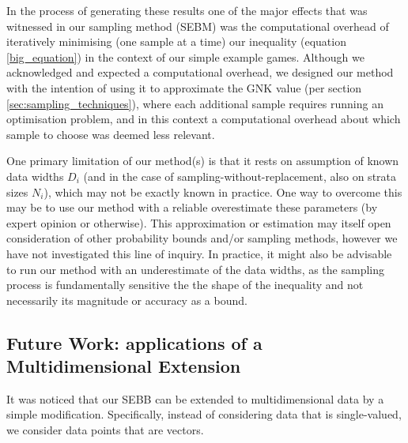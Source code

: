 In the process of generating these results one of the major effects that was witnessed in our sampling method (SEBM) was the computational overhead of iteratively minimising (one sample at a time) our inequality (equation \ref{big_equation}) in the context of our simple example games.
Although we acknowledged and expected a computational overhead, we designed our method with the intention of using it to approximate the GNK value (per section \ref{sec:sampling_techniques}), where each additional sample requires running an optimisation problem, and in this context a computational overhead about which sample to choose was deemed less relevant.


% 

One primary limitation of our method(s) is that it rests on assumption of known data widths $D_i$ (and in the case of sampling-without-replacement, also on strata sizes $N_i$), which may not be exactly known in practice.
One way to overcome this may be to use our method with a reliable overestimate these parameters (by expert opinion or otherwise). This approximation or estimation may itself open consideration of other probability bounds and/or sampling methods, however we have not investigated this line of inquiry. 
In practice, it might also be advisable to run our method with an underestimate of the data widths, as the sampling process is fundamentally sensitive the the shape of the inequality and not necessarily its magnitude or accuracy as a bound.








\subsection{Future Work: applications of a Multidimensional Extension}\label{sec:multi}

It was noticed that our SEBB can be extended to multidimensional data by a simple modification.
Specifically, instead of considering data that is single-valued, we consider data points that are vectors. 

